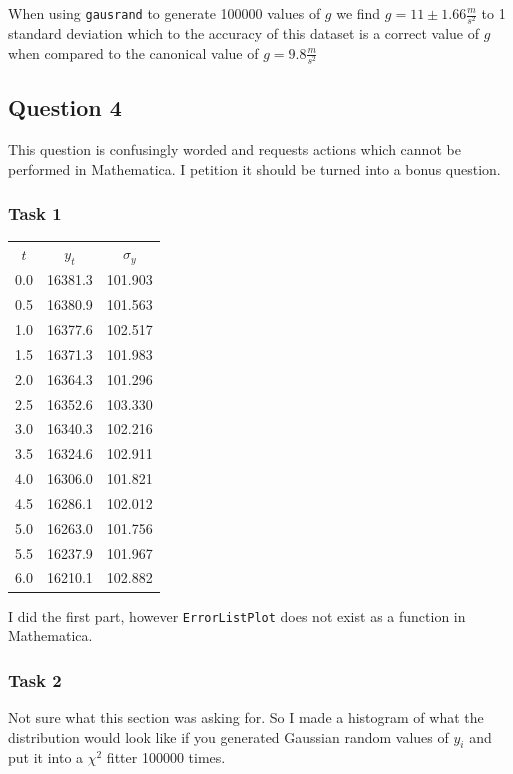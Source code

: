 \documentclass{article}
\begin{document}
When using \texttt{gausrand} to generate 100000 values of $g$ we find  $g = 11 \pm 1.66 \frac{m}{s^2}$ to 1 standard deviation which to the accuracy of this dataset is a correct value of $g$ when compared to the canonical value of  $g=9.8 \frac{m}{s^2}$

\subsection{Question 4}

This question is confusingly worded and requests actions which cannot be performed in Mathematica. I petition it should be turned into a bonus question.

\subsubsection{Task 1}

\begin{center}
	\begin{tabular}{ |c|c|c| }
		\hline
		$t$ &  $y_t$ &  $\sigma_y$\\
		0.0 & 16381.3 & 101.903 \\
		0.5 & 16380.9 & 101.563 \\
		1.0 & 16377.6 & 102.517 \\
		1.5 & 16371.3 & 101.983 \\
		2.0 & 16364.3 & 101.296 \\
		2.5 & 16352.6 & 103.330 \\
		3.0 & 16340.3 & 102.216 \\
		3.5 & 16324.6 & 102.911 \\
		4.0 & 16306.0 & 101.821 \\
		4.5 & 16286.1 & 102.012 \\
		5.0 & 16263.0 & 101.756 \\
		5.5 & 16237.9 & 101.967 \\
		6.0 & 16210.1 & 102.882 \\
		\hline
	\end{tabular}
\end{center}

I did the first part, however \texttt{ErrorListPlot} does not exist as a function in Mathematica.

\subsubsection{Task 2}

Not sure what this section was asking for. So I made a histogram of what the distribution would look like if you generated Gaussian random values of $y_i$ and put it into a $\chi^2$ fitter 100000 times.
\end{document}
